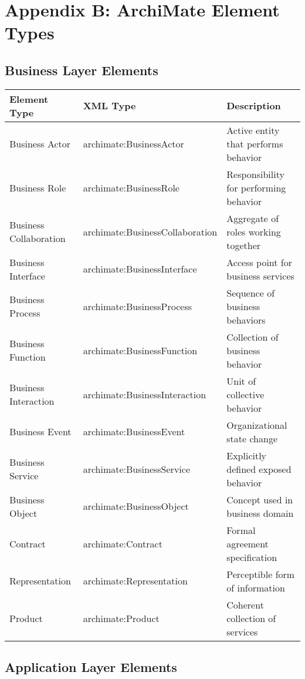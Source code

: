 \documentclass[12pt,a4paper]{report}
\begin{document}
\section{Appendix B: ArchiMate Element Types}

\subsection{Business Layer Elements}

\begin{longtable}{|l|l|p{6cm}|}
\hline
\textbf{Element Type} & \textbf{XML Type} & \textbf{Description} \\
\hline
\endhead
Business Actor & archimate:BusinessActor & Active entity that performs behavior \\
\hline
Business Role & archimate:BusinessRole & Responsibility for performing behavior \\
\hline
Business Collaboration & archimate:BusinessCollaboration & Aggregate of roles working together \\
\hline
Business Interface & archimate:BusinessInterface & Access point for business services \\
\hline
Business Process & archimate:BusinessProcess & Sequence of business behaviors \\
\hline
Business Function & archimate:BusinessFunction & Collection of business behavior \\
\hline
Business Interaction & archimate:BusinessInteraction & Unit of collective behavior \\
\hline
Business Event & archimate:BusinessEvent & Organizational state change \\
\hline
Business Service & archimate:BusinessService & Explicitly defined exposed behavior \\
\hline
Business Object & archimate:BusinessObject & Concept used in business domain \\
\hline
Contract & archimate:Contract & Formal agreement specification \\
\hline
Representation & archimate:Representation & Perceptible form of information \\
\hline
Product & archimate:Product & Coherent collection of services \\
\hline
\end{longtable}

\subsection{Application Layer Elements}
\end{document}
